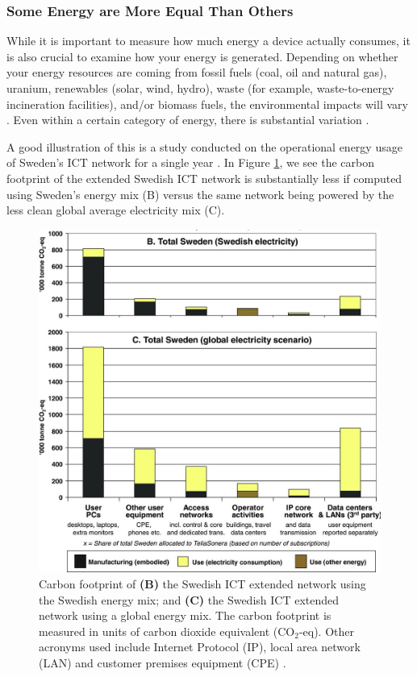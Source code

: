 \documentclass{article}
\begin{document}
\cleardoublepage
\subsubsection{Some Energy are More Equal Than Others}
While it is important to measure how much energy a device actually consumes, it is also crucial to examine how your energy is generated. Depending on whether your energy resources are coming from fossil fuels (coal, oil and natural gas), uranium, renewables (solar, wind, hydro), waste (for example, waste-to-energy incineration facilities), and/or biomass fuels, the environmental impacts will vary \cite{dincer2000renewable}. Even within a certain category of energy, there is substantial variation \cite{boyle2004renewable}.

A good illustration of this is a study conducted on the operational energy usage of Sweden's ICT network for a single year \cite{malmodin2014life}. In Figure \ref{usage_sweden_global_mix}, we see the carbon footprint of the extended Swedish ICT network is substantially less if computed using Sweden's energy mix (B) versus the same network being powered by the less clean global average electricity mix (C).

\begin{figure}[h]
    \includegraphics[width=.76 \textwidth]{./images/usage_sweden_global_mix.jpeg}
    \centering
    \caption{Carbon footprint of \textbf{(B)} the Swedish ICT extended network using the Swedish energy mix; and \textbf{(C)} the Swedish ICT extended network using a global energy mix. The carbon footprint is measured in units of carbon dioxide equivalent (CO$_2$-eq). Other acronyms used include Internet Protocol (IP), local area network (LAN) and customer premises equipment (CPE) \cite{malmodin2014life}.}
    \label{usage_sweden_global_mix}
\end{figure}
\end{document}
